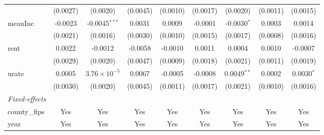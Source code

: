 \begin{tabular}{lcccccccc}
                        & (0.0027)                      & (0.0020)                    & (0.0045)                         & (0.0010)                      & (0.0017)                      & (0.0020)                       & (0.0011)                       & (0.0015)\\   
   meanInc              & -0.0023                       & -0.0045$^{***}$             & 0.0031                           & 0.0009                        & -0.0001                       & -0.0030$^{*}$                  & 0.0003                         & 0.0014\\   
                        & (0.0021)                      & (0.0016)                    & (0.0030)                         & (0.0010)                      & (0.0015)                      & (0.0017)                       & (0.0008)                       & (0.0016)\\   
   rent                 & 0.0022                        & -0.0012                     & -0.0058                          & -0.0010                       & 0.0011                        & 0.0004                         & 0.0010                         & -0.0007\\   
                        & (0.0029)                      & (0.0020)                    & (0.0047)                         & (0.0009)                      & (0.0018)                      & (0.0021)                       & (0.0011)                       & (0.0019)\\   
   urate                & 0.0005                        & $3.76\times 10^{-5}$        & 0.0067                           & -0.0005                       & -0.0008                       & 0.0049$^{**}$                  & 0.0002                         & 0.0030$^{*}$\\   
                        & (0.0030)                      & (0.0020)                    & (0.0045)                         & (0.0011)                      & (0.0017)                      & (0.0021)                       & (0.0010)                       & (0.0016)\\   
   \midrule
   \emph{Fixed-effects}\\
   county\_fips         & Yes                           & Yes                         & Yes                              & Yes                           & Yes                           & Yes                            & Yes                            & Yes\\  
   year                 & Yes                           & Yes                         & Yes                              & Yes                           & Yes                           & Yes                            & Yes                            & Yes\\  

\end{tabular}
